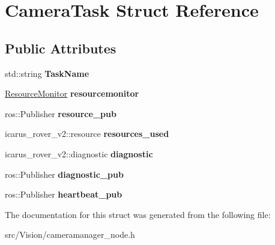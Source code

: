 \hypertarget{structCameraTask}{}\section{Camera\+Task Struct Reference}
\label{structCameraTask}
\subsection*{Public Attributes}
\begin{DoxyCompactItemize}
\item 
\mbox{\label{structCameraTask_a6010329607eac69a414f4a386f747be3}} 
std\+::string {\bfseries Task\+Name}
\item 
\mbox{\label{structCameraTask_a52079360fa06c30c6fcd36986e8d3a1f}} 
\hyperlink{classResourceMonitor}{Resource\+Monitor} {\bfseries resourcemonitor}
\item 
\mbox{\label{structCameraTask_ae7655b6875eed3e0a36bfcc38e680ac6}} 
ros\+::\+Publisher {\bfseries resource\+\_\+pub}
\item 
\mbox{\label{structCameraTask_ae35641618614ca50839b906b8950865f}} 
icarus\+\_\+rover\+\_\+v2\+::resource {\bfseries resources\+\_\+used}
\item 
\mbox{\label{structCameraTask_a097ed5b3f9aff345fbe6e673273314e8}} 
icarus\+\_\+rover\+\_\+v2\+::diagnostic {\bfseries diagnostic}
\item 
\mbox{\label{structCameraTask_a82e22650b17e42729725ada2acf9d12f}} 
ros\+::\+Publisher {\bfseries diagnostic\+\_\+pub}
\item 
\mbox{\label{structCameraTask_a892ecf05d884d36d8a97b365d64740d6}} 
ros\+::\+Publisher {\bfseries heartbeat\+\_\+pub}
\end{DoxyCompactItemize}


The documentation for this struct was generated from the following file\+:\begin{DoxyCompactItemize}
\item 
src/\+Vision/cameramanager\+\_\+node.\+h\end{DoxyCompactItemize}
